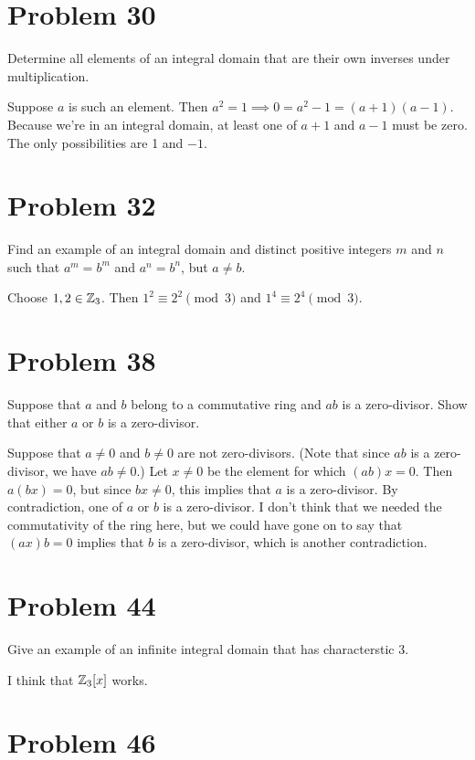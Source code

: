 \documentclass{article}
\begin{document}
\section*{Problem 30}

Determine all elements of an integral domain that are their
own inverses under multiplication.

Suppose $a$ is such an element.  Then $a^2=1\implies 0=a^2-1=(a+1)(a-1)$.
Because we're in an integral domain, at least one of $a+1$ and $a-1$ must be zero.
The only possibilities are 1 and $-1$.

\section*{Problem 32}

Find an example of an integral domain and distinct positive integers $m$
and $n$ such that $a^m=b^m$ and $a^n=b^n$, but $a\neq b$.

Choose $1,2\in\mathbb{Z}_3$.  Then $1^2\equiv 2^2\pmod{3}$ and $1^4\equiv 2^4\pmod{3}$.

\section*{Problem 38}

Suppose that $a$ and $b$ belong to a commutative ring and $ab$ is a zero-divisor.
Show that either $a$ or $b$ is a zero-divisor.

Suppose that $a\neq 0$ and $b\neq 0$ are not zero-divisors.
(Note that since $ab$ is a zero-divisor, we have $ab\neq 0$.)
Let $x\neq 0$ be the element for which $(ab)x=0$.
Then $a(bx)=0$, but since $bx\neq 0$, this implies that $a$ is a zero-divisor.
By contradiction, one of $a$ or $b$ is a zero-divisor.
I don't think that we needed the commutativity of the ring here, but
we could have gone on to say that $(ax)b=0$ implies that $b$ is a zero-divisor,
which is another contradiction.

\section*{Problem 44}

Give an example of an infinite integral domain that has characterstic 3.

I think that $\mathbb{Z}_3[x]$ works.

\section*{Problem 46}
\end{document}
